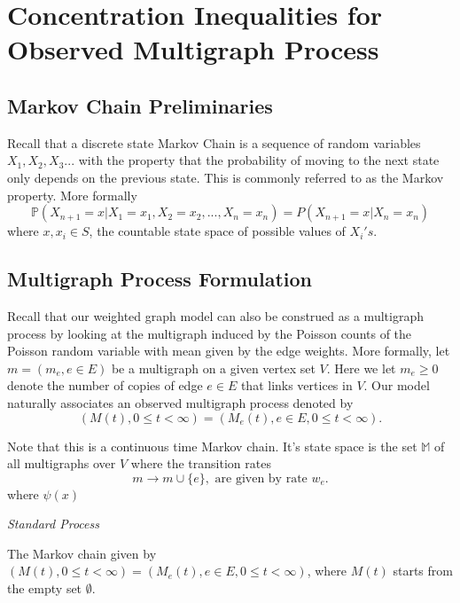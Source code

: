 \chapter{Concentration Inequalities for Observed Multigraph Process}

\section{Markov Chain Preliminaries}

Recall that a discrete state Markov Chain is a sequence of random variables $X_1, X_2, X_3...$ with the property that the probability of moving to the next state only depends on the previous state.  This is commonly referred to as the Markov property.  More formally $$ \mathbb{P}(X_{n+1} = x | X_1 = x_1, X_2 = x_2, ..., X_n = x_n) =P(X_{n+1} = x | X_n = x_n)$$ where $x, x_i \in S$, the countable state space of possible values of $X_i's$.  

\section{Multigraph Process Formulation}

Recall that our weighted graph model can also be construed as a multigraph process by looking at the multigraph induced by the Poisson counts of the Poisson random variable with mean given by the edge weights.  More formally, let $m = (m_e, e\in E)$ be a multigraph on a given vertex set $V$.  Here we let $m_e \geq 0$ denote the number of copies of edge $e \in E$ that links vertices in $V$.  Our model naturally associates an observed multigraph process denoted by $$(M(t), 0 \leq t < \infty) = (M_e(t), e\in E, 0 \leq t < \infty).$$

Note that this is a continuous time Markov chain.  It's state space is the set $\mathbb{M}$ of all multigraphs over $V$ where the transition rates $$ m \rightarrow m \cup \{ e\}, \text{  are given by rate   } w_e.$$
\bigskip
where $\psi(x)$
\bigskip

\begin{definition}\textit{Standard Process}

The Markov chain given by $(M(t), 0 \leq t < \infty) = (M_e(t), e\in E, 0 \leq t < \infty)$, where  $M(t)$ starts from the empty set $\emptyset.$
\end{definition}

